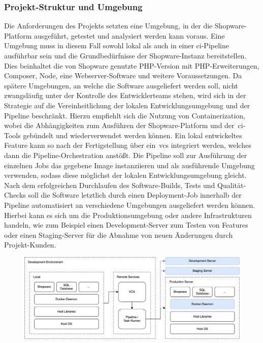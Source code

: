 \subsubsection{Projekt-Struktur und Umgebung}

Die Anforderungen des Projekts setzten eine Umgebung, in der die Shopware-Platform ausgeführt, getestet und analysiert
werden kann voraus.
Eine Umgebung muss in diesem Fall sowohl lokal als auch in einer \acrshort{ci}-Pipeline ausführbar sein und die
Grundbedürfnisse der Shopware-Instanz bereitstellen.
Dies beinhaltet die von Shopware genutzte PHP-Version mit PHP-Erweiterungen, Composer, Node, eine
Webserver-Software und weitere Voraussetzungen.
Da spätere Umgebungen, an welche die Software ausgeliefert werden soll, nicht zwangsläufig unter der
Kontrolle des Entwicklerteams stehen, wird sich in der Strategie auf die Vereinheitlichung der lokalen
Entwicklungsumgebung und der Pipeline beschränkt.
Hierzu empfiehlt sich die Nutzung von Containerization, wobei die Abhängigkeiten zum Ausführen der Shopware-Platform
und der\ \acrshort{ci}-Tools gebündelt und wiederverwendet werden können.
Ein lokal entwickeltes Feature kann so nach der Fertigstellung über ein\ \acrshort{vcs} integriert werden, welches dann
die Pipeline-Orchestration anstößt.
Die Pipeline soll zur Ausführung der einzelnen Jobs das gegebene Image instanziieren und als ausführende
Umgebung verwenden, sodass diese möglichst der lokalen Entwicklungsumgebung gleicht.
Nach dem erfolgreichen Durchlaufen des Software-Builds, Tests und Qualität-Checks soll die Software letztlich durch
einen Deployment-Job innerhalb der Pipeline automatisiert an verschiedene Umgebungen ausgeliefert werden können.
Hierbei kann es sich um die Produktionsumgebung oder andere Infrastrukturen handeln, wie zum Beispiel einen
Development-Server zum Testen von Features oder einen Staging-Server für die Abnahme von neuen Änderungen durch
Projekt-Kunden.

\begin{figure}[H]
    \centering
    \includegraphics[width=\textwidth]{images/content/ci-architecture-concept}
    \label{fig:ci-architecture-concept}
\end{figure}

